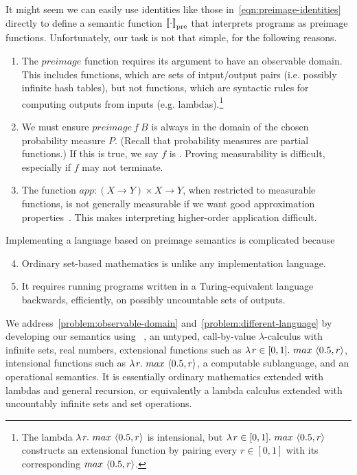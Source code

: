 \documentclass{llncs}
\newcommand{\pre}{_\mathrm{pre}}
\begin{document}
It might seem we can easily use identities like those in~\eqref{eqn:preimage-identities} directly to define a semantic function $\meaningof{\cdot}\pre$ that interprets programs as preimage functions.
Unfortunately, our task is not that simple, for the following reasons.
\begin{enumerate}
	\item The $preimage$ function requires its argument to have an observable domain. This includes  functions, which are sets of intput/output pairs (i.e. possibly infinite hash tables), but not  functions, which are syntactic rules for computing outputs from inputs (e.g. lambdas).\footnote{The lambda $\lambda\mspace{2mu}{r}\ldotp\, max~\langle{0.5,r}\rangle$ is intensional, but $\lambda\mspace{2mu}{r \in [0,1]}\ldotp\, max~\langle{0.5,r}\rangle$ constructs an extensional function by pairing every $r \in [0,1]$ with its corresponding $max~\langle{0.5,r}\rangle$.}\xspace
\label{problem:observable-domain}
	\item We must ensure $preimage~f~B$ is always in the domain of the chosen probability measure $P$. (Recall that probability measures are partial functions.) If this is true, we say $f$ is . Proving measurability is difficult, especially if $f$ may not terminate.%
\label{problem:measurability}
	\item The function $app : (X \to Y) \times X \to Y$, when restricted to measurable functions, is not generally measurable if we want good approximation properties~\cite{cit:aumann-1961ijm-borel}. This makes interpreting higher-order application difficult.%
\label{problem:higher-orderness}
\end{enumerate}
Implementing a language based on preimage semantics is complicated because
\begin{enumerate}
	\setcounter{enumi}{3}
	\item Ordinary set-based mathematics is unlike any implementation language.%
\label{problem:different-language}
	\item It requires running programs written in a Turing-equivalent language backwards, efficiently, on possibly uncountable sets of outputs.%
\label{problem:backward-efficient}
\end{enumerate}

We address~\ref{problem:observable-domain} and~\ref{problem:different-language} by developing our semantics using \lzfclang~\cite{cit:toronto-2012flops-lzfc}, an untyped, call-by-value $\lambda$-calculus with infinite sets, real numbers, extensional functions such as $\lambda\mspace{2mu}{r \in [0,1]}\ldotp\, max~\langle{0.5,r}\rangle$, intensional functions such as $\lambda\mspace{2mu}{r}\ldotp\, max~\langle{0.5,r}\rangle$, a computable sublanguage, and an operational semantics.
It is essentially ordinary mathematics extended with lambdas and general recursion, or equivalently a lambda calculus extended with uncountably infinite sets and set operations.
\end{document}
